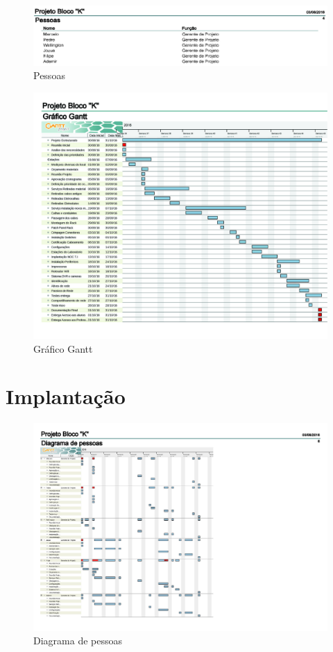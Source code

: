 \documentclass[	DIV=calc,%
							paper=a4,%
							fontsize=12pt,%
							onecolumn]{scrartcl}	 					%
\begin{document}
\begin{figure}[!h]
	\centering
	\caption{Pessoas}
	\includegraphics{a4}
\end{figure}
\begin{figure}[!h]
	\centering
	\caption{Gráfico Gantt}
	\includegraphics{c1}
\end{figure}
\section{Implantação}
\begin{figure}[!h]
	\centering
	\caption{Diagrama de pessoas}
	\includegraphics{c2}
\end{figure}
\end{document}
